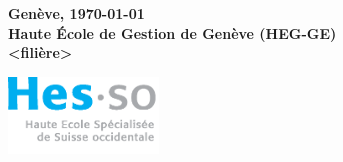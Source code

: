 \date{\vfill{}
}

\noindent \begin{center}
\textbf{\large Genève, \today{}}\\
\textbf{\large Haute École de Gestion de Genève (HEG-GE)}\\
\textbf{\large <filière>}
\par\end{center}{\large \par}

\vspace{2cm}


\begin{flushright}
\includegraphics[width=4cm]{images/hes-logo.eps}
\end{flushright}

\thispagestyle{empty}
\styleCenter

